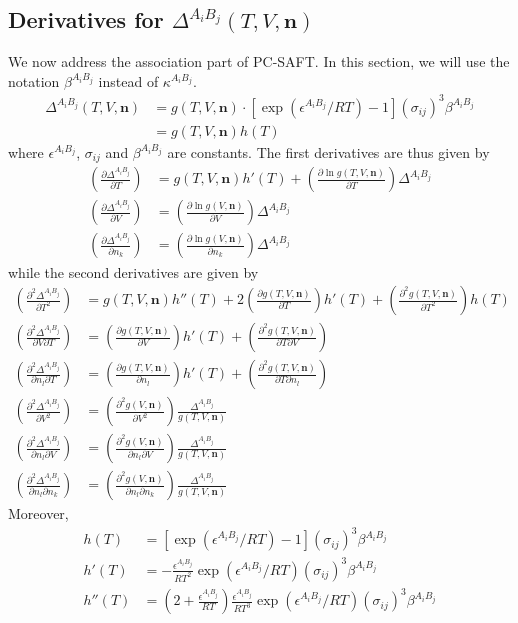 \documentclass[english]{../thermomemo/thermomemo}
\newcommand{\mbf}[0]{\mathbf}
\newcommand*{\pder}[2]{\left(\frac{\partial #1}{\partial #2}\right)}
\newcommand*{\pdder}[2]{\left(\frac{\partial^2 #1}{\partial #2^2}\right)}
\newcommand*{\pdcross}[3]{\left(\frac{\partial^2 #1}{\partial #2 \partial #3}\right)}
\newcommand{\lp}{\left(}
\newcommand{\rp}{\right)}
\begin{document}
\subsection{Derivatives for $\Delta^{A_i B_j}(T,V,\mbf n)$}
We now address the association part of PC-SAFT. In this section, we will use the
notation $\beta^{A_i B_j}$ instead of $\kappa^{A_i B_j}$.
\begin{align}
  \Delta^{A_i B_j}(T,V,\mbf n) &= g(T,V,\mbf n) \cdot [\exp(\epsilon^{A_i B_j}/RT) - 1] (\sigma_{ij})^3 \beta^{A_i B_j} \\ 
  &=g(T,V,\mbf n) h(T)
\end{align}
where $\epsilon^{A_i B_j}$, $\sigma_{ij}$ and $\beta^{A_i B_j}$ are
constants. The first derivatives are thus given by
\begin{align}
  \pder{\Delta^{A_i B_j}}{T}   &= g(T,V,\mbf n) h'(T) + \pder{\ln g(T,V,\mbf n)}{T} \Delta^{A_i B_j}\\
  \pder{\Delta^{A_i B_j}}{V}   &= \pder{\ln g(V,\mbf n)}{V} \Delta^{A_i B_j} \\
  \pder{\Delta^{A_i B_j}}{n_k} &= \pder{\ln g(V,\mbf n)}{n_k} \Delta^{A_i B_j}
\end{align}
while the second derivatives are given by
\begin{align}
  \pdder{\Delta^{A_i B_j}}{T}   &=  g(T,V,\mbf n) h''(T) + 2 \pder{g(T,V,\mbf n)}{T} h'(T) + \pdder{g(T,V,\mbf n)}{T} h(T) \\
  \pdcross{\Delta^{A_i B_j}}{V}{T}  &= \pder{g(T,V,\mbf n)}{V} h'(T) + \pdcross{g(T,V,\mbf n)}{T}{V} \\
  \pdcross{\Delta^{A_i B_j}}{n_l}{T}  &= \pder{g(T,V,\mbf n)}{n_l} h'(T) + \pdcross{g(T,V,\mbf n)}{T}{n_l} \\
  \pdder{\Delta^{A_i B_j}}{V}   &= \pdder{g(V,\mbf n)}{V}  \frac{\Delta^{A_i B_j}}{g(T,V,\mbf n)} \\
  \pdcross{\Delta^{A_i B_j}}{n_l}{V}  &= \pdcross{g(V,\mbf n)}{n_l}{V} \frac{\Delta^{A_i B_j}}{g(T,V,\mbf n)} \\
  \pdcross{\Delta^{A_i B_j}}{n_l}{n_k}  &= \pdcross{g(V,\mbf n)}{n_l}{n_k} \frac{\Delta^{A_i B_j}}{g(T,V,\mbf n)} 
\end{align}
Moreover,
\begin{align}
  h(T) &= [\exp(\epsilon^{A_i B_j}/RT) - 1] (\sigma_{ij})^3 \beta^{A_i B_j} \\
  h'(T) &= -\frac{\epsilon^{A_i B_j}}{RT^2} \exp(\epsilon^{A_i B_j}/RT) (\sigma_{ij})^3 \beta^{A_i B_j} \\
  h''(T) &= \lp 2 + \frac{\epsilon^{A_i B_j}}{RT} \rp \frac{\epsilon^{A_i B_j}}{RT^3} \exp(\epsilon^{A_i B_j}/RT) (\sigma_{ij})^3 \beta^{A_i B_j} 
\end{align}
\end{document}
